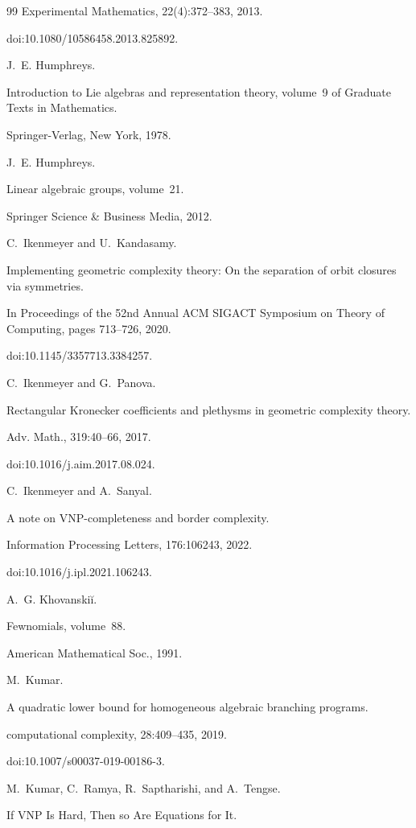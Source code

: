 \begin{thebibliography}{99}
Experimental Mathematics, 22(4):372–383, 2013.


doi:10.1080/10586458.2013.825892.

J. E. Humphreys.


Introduction to Lie algebras and representation theory,
volume 9 of Graduate Texts in Mathematics.


Springer-Verlag, New York, 1978.

J. E. Humphreys.


Linear algebraic groups, volume 21.


Springer Science \& Business Media, 2012.

C. Ikenmeyer and U. Kandasamy.


Implementing geometric complexity theory: On the separation of orbit
closures via symmetries.


In Proceedings of the 52nd Annual ACM SIGACT Symposium on
Theory of Computing, pages 713–726, 2020.


doi:10.1145/3357713.3384257.

C. Ikenmeyer and G. Panova.


Rectangular Kronecker coefficients and plethysms in geometric
complexity theory.


Adv. Math., 319:40–66, 2017.


doi:10.1016/j.aim.2017.08.024.

C. Ikenmeyer and A. Sanyal.


A note on VNP-completeness and border complexity.


Information Processing Letters, 176:106243, 2022.


doi:10.1016/j.ipl.2021.106243.

A. G. Khovanskiĭ.


Fewnomials, volume 88.


American Mathematical Soc., 1991.

M. Kumar.


A quadratic lower bound for homogeneous algebraic branching
programs.


computational complexity, 28:409–435, 2019.


doi:10.1007/s00037-019-00186-3.

M. Kumar, C. Ramya, R. Saptharishi, and A. Tengse.


If VNP Is Hard, Then so Are Equations for It.



\end{thebibliography}
